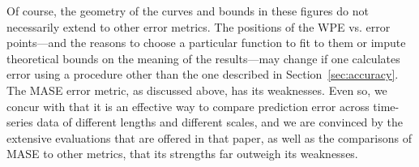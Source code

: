 Of course, the geometry of the curves and bounds in these figures do
not necessarily extend to other error metrics.  The positions of the
WPE vs. error points---and the reasons to choose a particular function
to fit to them or impute theoretical bounds on the meaning of the
results---may change if one calculates error using a procedure other
than the one described in Section~\ref{sec:accuracy}.  The MASE error
metric, as discussed above, has its weaknesses.  Even so, we concur
with \cite{MASE} that it is an effective way to compare prediction
error across time-series data of different lengths and different
scales, and we are convinced by the extensive evaluations that are
offered in that paper, as well as the comparisons of MASE to other
metrics, that its strengths far outweigh its weaknesses.







